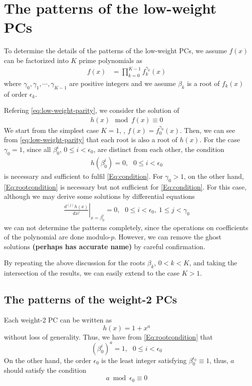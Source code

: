 \section{The patterns of the low-weight PCs}
\label{sec3}
To determine the details of the patterns of the low-weight PCs, we assume $f(x)$ can be factorized into $K$ prime polynomials as 
\begin{align}
f(x)&=\prod_{k=0}^{K-1}f_k^{\gamma_k}(x)
\end{align}
where $\gamma_0,\gamma_1,\cdots,\gamma_{K-1}$ are positive integers and we assume $\beta_k$ is a root of $f_{k}(x)$ of order $\epsilon_k$.

Refering \eqref{eq:low-weight-parity}, we consider the solution of
\begin{align}
	h(x) \mod f(x) \equiv 0
	\label{Eq:condition}
\end{align}
%
We start from the simplest case $K=1$, \ie, $f(x) = f_0^{\gamma_0}(x)$. Then, we can see from \eqref{eq:low-weight-parity} that each root is also a root of $h(x)$. For the case $\gamma_0 = 1$, since all $\beta_0^i$, $0 \leq i < \epsilon_0$, are distinct from each other, the condition
\begin{align}
	h(\beta_0^i)=0,~~~ 0 \leq i < \epsilon_0
	\label{Eq:rootcondition}
\end{align}
is necessary and sufficient to fulfil \eqref{Eq:condition}. For $\gamma_0 > 1$, on the other hand, \eqref{Eq:rootcondition} is necessary but not sufficient for \eqref{Eq:condition}. For this case, although we may derive some solutions by differential equations
\begin{align}
\left.\frac{d^{(j)}h(x)}{d x^j}\right|_{x=\beta_0^i}=0,~~~0 \leq i < \epsilon_0,~1 \leq j < \gamma_0
\label{Eq:differential}
\end{align}
we can not determine the patterns completely, since the operations on coefficients of the polynomial are done modulo-$p$. However, we can remove the ghost solutions {\bf (perhaps has accurate name)} by careful confirmation.

By repeating the above discussion for the roots $\beta_k$, $0 < k < K$, and taking the intersection of the results, we can easily extend to the case $K>1$.

\subsection{The patterns of the weight-2 PCs}
\label{sec:PC2}
Each weight-2 PC can be written as 
\begin{equation}
h(x)=1+x^a
\label{eq:wt2-gen-form}
\end{equation}
without loss of generality. Thus, we have from \eqref{Eq:rootcondition} that
\begin{equation}
(\beta_0^i)^a =1,~~~ 0 \leq i < \epsilon_0
\label{novelEq5b}
\end{equation}
On the other hand, the order $\epsilon_0$ is the least integer satisfying $\beta_0^{\epsilon_0} \equiv 1$, thus, $a$ should satisfy the condition
$$a \bmod \epsilon_0  \equiv 0$$

